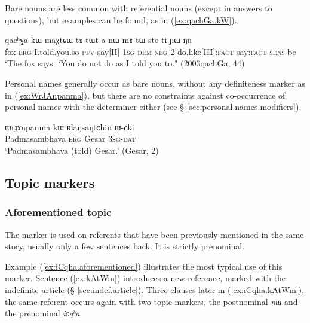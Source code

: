 Bare nouns are less common with referential nouns (except in answers to questions), but examples can be found, as  in (\ref{ex:qachGa.kW}).

\begin{exe}
\ex \label{ex:qachGa.kW}
\gll qacʰɣa 	kɯ maχtɕɯ tɤ-tɯt-a nɯ mɤ-tɯ-ste ti ɲɯ-ŋu \\
fox \textsc{erg} I.told.you.so \textsc{pfv}-say[II]-\textsc{1sg} \textsc{dem} \textsc{neg}-2-do.like[III]:\textsc{fact} say:\textsc{fact} \textsc{sens}-be \\
\glt `The fox says: `You do not do as I told you to." (2003qachGa, 44)
\end{exe}

Personal names generally occur as bare nouns, without any definiteness marker as in (\ref{ex:WrJAnpanma}), but there are no constraints against co-occurrence of personal names with the determiner  either (see § \ref{sec:personal.names.modifiers}).

\begin{exe}
\ex \label{ex:WrJAnpanma}
\gll  ɯrɟɤnpanma kɯ ʁlaŋsaŋtɕhin ɯ-ɕki  \\
 Padmasambhava \textsc{erg} Gesar \textsc{3sg}-\textsc{dat} \\
\glt `Padmasambhava (told) Gesar.' (Gesar, 2)
\end{exe}

 \subsection{Topic markers} \label{sec:topic}
 
 \subsubsection{Aforementioned topic} \label{sec:iCqha}
 The marker   is used on referents that have been previously mentioned in the same story, usually only a few sentences back. It is strictly prenominal. 
 
Example (\ref{ex:iCqha.aforementioned}) illustrates the most typical use of this marker. Sentence (\ref{ex:kAtWm}) introduces a new reference,  marked with the indefinite article  (§ \ref{sec:indef.article}). Three clauses later in (\ref{ex:iCqha.kAtWm}), the same referent occurs again with two topic markers, the postnominal \textit{nɯ} and the prenominal \textit{iɕqʰa}.
 
